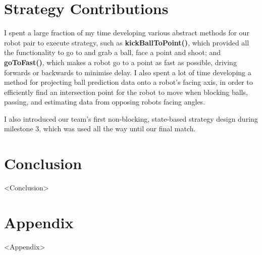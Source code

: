 \documentclass[a4paper,11pt]{article}
\begin{document}

\section{Strategy Contributions}

I spent a large fraction of my time developing various abstract methods for our robot pair to execute strategy, such as \textbf{kickBallToPoint()}, which provided all the functionality to go to and grab a ball, face a point and shoot; and \textbf{goToFast()}, which makes a robot go to a point as fast as possible, driving forwards or backwards to minimise delay. I also spent a lot of time developing a method for projecting ball prediction data onto a robot's facing axis, in order to efficiently find an intersection point for the robot to move when blocking balls, passing, and estimating data from opposing robots facing angles.

I also introduced our team's first non-blocking, state-based strategy design during milestone 3, which was used all the way until our final match.


\section{Conclusion}

<Conclusion>


\section{Appendix}

<Appendix>
\end{document}
